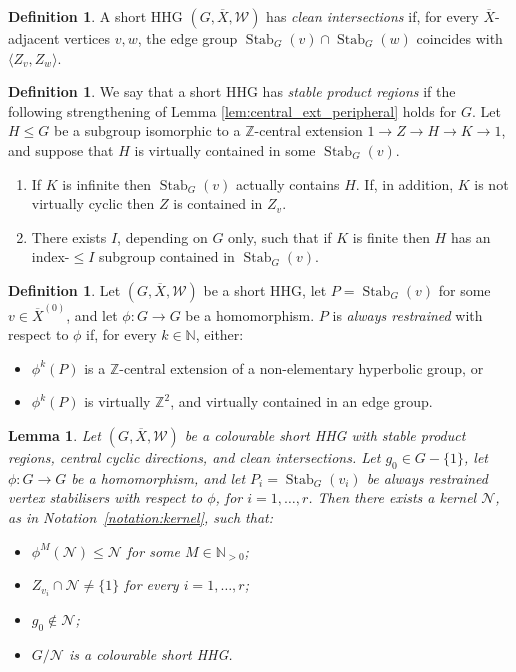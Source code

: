 \documentclass[svgnames]{amsart}
\theoremstyle{plain}
\newtheorem{lemma}[thm]{Lemma}
\theoremstyle{definition}
\newtheorem{defn}[thm]{Definition}
\newcommand{\Z}{\mathbb{Z}}
\newcommand{\ov}[1]{\overline{#1}}
\newcommand{\Stab}[2]{\operatorname{Stab}_{#1}(#2)}
\newcommand{\N}{\mathcal{N}}
\newcommand{\W}{\mathcal{W}}
\begin{document}
\begin{defn}\label{defn:clean_int}
    A short HHG $(G, \ov X, \W)$ has \emph{clean intersections} if, for every $\ov X$-adjacent vertices $v,w$, the edge group $\Stab{G}{v}\cap \Stab{G}{w}$ coincides with $\langle Z_v, Z_w\rangle$. 
\end{defn}

\begin{defn}\label{defn:stable_pr}
    We say that a short HHG has \emph{stable product regions} if the following strengthening of Lemma \ref{lem:central_ext_peripheral} holds for $G$. 
    Let $H\le G$ be a subgroup isomorphic to a $\mathbb Z$-central extension $1\to Z\to H\to K\to 1$, and suppose that $H$ is virtually contained in some $\Stab{G}{v}$.
    \begin{enumerate}
        \item \label{item_stable_1} If $K$ is infinite then $\Stab{G}{v}$ actually contains $H$. If, in addition, $K$ is not virtually cyclic then $Z$ is contained in $Z_v$.
        \item \label{item_stable_2} There exists $I$, depending on $G$ only, such that if $K$ is finite then $H$ has an index-$\leq I$ subgroup contained in $\Stab{G}{v}$.
    \end{enumerate}
\end{defn}




\newcommand{\good}{always restrained}
\begin{defn}\label{defn:good_pr}
    Let $(G, \ov X,\W)$ be a short HHG, let $P=\Stab{G}{v}$ for some $v\in \ov X^{(0)}$, and let $\phi\colon G\to G$ be a homomorphism. $P$ is \emph{\good{}} with respect to $\phi$ if, for every $k\in\mathbb{N}$, either:
    \begin{itemize}
        \item $\phi^k(P)$ is a $\Z$-central extension of a non-elementary hyperbolic group, or
        \item $\phi^k(P)$ is virtually $\Z^2$, and virtually contained in an edge group.
    \end{itemize}
\end{defn}



\begin{lemma}\label{lem:quotient_for_good_stuff}
    Let $(G, \ov X,\W)$ be a colourable short HHG with stable product regions, central cyclic directions, and clean intersections. Let $g_0\in G-\{1\}$, let $\phi\colon G\to G$ be a homomorphism, and let $P_i=\Stab{G}{v_i}$ be \good{} vertex stabilisers with respect to $\phi$, for $i=1,\ldots, r$. Then there exists a kernel $\N$, as in Notation~\ref{notation:kernel}, such that:
    \begin{itemize}
        \item $\phi^M(\N)\le \N$ for some $M\in \mathbb{N}_{>0}$;
        \item $Z_{v_i}\cap \N\neq \{1\}$ for every $i=1,\ldots, r$;
        \item $g_0\not\in \N$;
        \item $G/\N$ is a colourable short HHG.
    \end{itemize}
\end{lemma}
\end{document}
